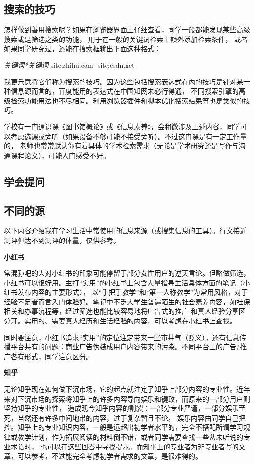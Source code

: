 \documentclass[12pt]{article}
\begin{document}
\subsection{搜索的技巧}
怎样做到善用搜索呢？如果在浏览器界面上仔细查看，同学一般都能发现某些\textcolor[rgb]{0,0.39,0}{高级搜索}或是\textcolor[rgb]{0,0.4,0}{筛选}之类的功能，
用于在一般的关键词检索上额外添加检索条件，
或者如果同学研究过，还能在搜索框输出下面这种格式：

\begin{mdframed}[backgroundcolor=lightgray, linewidth=0pt]
    \textit{关键词*关键词} site:zhihu.com -site:csdn.net
\end{mdframed}

我更乐意将它们称为搜索的技巧。因为这些包括搜索表达式在内的技巧是针对某一种信息源而言的，百度能用的表达式在中国知网未必行得通，
不同搜索引擎的高级检索功能用法也不尽相同。利用浏览器插件和脚本优化搜索结果等也是类似的技巧。

学校有一门通识课《图书馆概论》或《信息素养》，会稍微涉及上述内容，同学可以考虑选课或旁听（如果设备不够可能不接受旁听）。不过这门课是有一定工作量的，
老师也常常默认你有着具体的学术检索需求（无论是学术研究还是写作与沟通课程论文），可能入门感受不好。
\subsection{学会提问}

\subsection{不同的源}
以下内容介绍我在学习生活中常使用的信息来源（或搜集信息的工具）。行文接近测评但达不到测评的体量，仅供参考。

\textbf{小红书}

常混孙吧的人对小红书的印象可能停留于部分女性用户的逆天言论。但略做筛选，小红书可以很好用。主打“实用”的小红书上包含大量指导生活具体方面的笔记（小红书发布内容的主要形式），
以“手把手教学”和“第一人称教学”为常用风格，对于经验不足者而言入门体验好。笔记中不乏大学生普遍陌生的社会素养内容，如社保相关和办事流程等，经过筛选也能比较容易地将广告式的推广
和真人经验分享区分开。实用的、需要真人经历和生活经验的内容，可以考虑在小红书上查找。

同时要注意，小红书追求“实用”的定位注定带来一些市井气（贬义），还有信息传播平台共有的问题：商业广告伪装成用户内容带来的污染。不同平台上的广告/推广各有形式，同学注意区分。

\textbf{知乎}

无论知乎现在如何做下沉市场，它的起点就注定了知乎上部分内容的专业性。近年来对下沉市场的探索将知乎上的许多内容导向娱乐和键政，而原来的一部分用户则坚持知乎的专业性，
造成现今知乎内容的割裂：一部分专业严谨，一部分娱乐至死，当然还有许多中间地带的内容，过于复杂暂且不论。
娱乐内容由同学自己把控。知乎上的专业知识内容，一般是远超出初学者水平的，完全不搭配所谓学习规律或教学计划，作为拓展阅读的材料倒不错，或者同学需要查找一些从未听说的专业术语时，
也可以在这些回答中寻找提示。而知乎上的专业者为非专业者写的文章，可以参考，不过能完全考虑初学者需求的文章，是很难得的。
\end{document}
